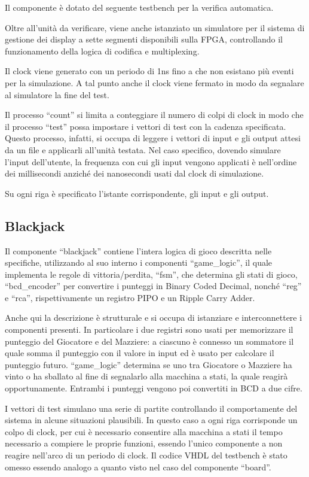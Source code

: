 \documentclass [11pt,a4paper,oneside,draft]{article}
\begin{document}
Il componente è dotato del seguente testbench per la verifica automatica.



Oltre all'unità da verificare, viene anche istanziato un simulatore per il
sistema di gestione dei display a sette segmenti disponibili sulla FPGA,
controllando il funzionamento della logica di codifica e multiplexing.

Il clock viene generato con un periodo di 1ns fino a che non esistano più
eventi per la simulazione. A tal punto anche il clock viene fermato in 
modo da segnalare al simulatore la fine del test.

Il processo ``count'' si limita a conteggiare il numero di colpi di clock
in modo che il processo ``test'' possa impostare i vettori di test con 
la cadenza specificata. Questo processo, infatti, si occupa di leggere
i vettori di input e gli output attesi da un file e applicarli all'unità
testata. Nel caso specifico, dovendo simulare l'input dell'utente, la
frequenza con cui gli input vengono applicati è nell'ordine dei 
millisecondi anziché dei nanosecondi usati dal clock di simulazione.



Su ogni riga è specificato l'istante corrispondente, gli input e gli
output.

\subsection{Blackjack}
Il componente ``blackjack'' contiene l'intera logica di gioco descritta
nelle specifiche, utilizzando al suo interno i componenti
``game\_logic'', il quale implementa le regole di vittoria/perdita,
``fsm'', che determina gli stati di gioco, ``bcd\_encoder'' per
convertire i punteggi in Binary Coded Decimal, nonché ``reg'' e ``rca'',
rispettivamente un registro PIPO e un Ripple Carry Adder.




Anche qui la descrizione è strutturale e si occupa di istanziare e 
interconnettere i componenti presenti. In particolare i due registri
sono usati per memorizzare il punteggio del Giocatore e del Mazziere:
a ciascuno è connesso un sommatore il quale somma il punteggio con il
valore in input ed è usato per calcolare il punteggio futuro.
``game\_logic'' determina se uno tra Giocatore o Mazziere ha vinto o
ha sballato al fine di segnalarlo alla macchina a stati, la quale
reagirà opportunamente. Entrambi i punteggi vengono poi convertiti in
BCD a due cifre.



I vettori di test simulano una serie di partite controllando il 
comportamente del sistema in alcune situazioni plausibili.
In questo caso a ogni riga corrisponde un colpo di clock, per cui
è necessario consentire alla macchina a stati il tempo necessario
a compiere le proprie funzioni, essendo l'unico componente a non
reagire nell'arco di un periodo di clock. Il codice VHDL del 
testbench è stato omesso essendo analogo a quanto visto nel caso del
componente ``board''.
\end{document}
